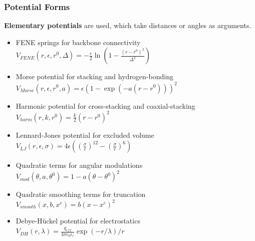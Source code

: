 \documentclass[slidestop,compress,9pt]{beamer}
\begin{document}
\begin{frame}
\frametitle{Potential Forms}
\textbf{Elementary potentials} are used, which take distances or angles as arguments.\\[10pt]
\begin{itemize}
\setlength\itemsep{7pt}
\item FENE springs for backbone connectivity\\
$V_{FENE}(r,\epsilon,r^0,\Delta)=-\frac{\epsilon}{2}\ln\left(1-\frac{(r-r^0)^2}{\Delta^2}\right)$
\item Morse potential for stacking and hydrogen-bonding\\
$V_{Morse}(r,\epsilon,r^0,a)=\epsilon(1-\exp(-a(r-r^0)))^2$
\item Harmonic potential for cross-stacking and coaxial-stacking\\
$V_{harm}(r,k,r^0)=\frac{k}{2}(r-r^0)^2$
\item Lennard-Jones potential for excluded volume\\
$V_{LJ}(r,\epsilon,\sigma)=4\epsilon\left(\left(\frac{\sigma}{r}\right)^{12} - \left(\frac{\sigma}{r}\right)^6\right)$
\item Quadratic terms for angular modulations\\
$V_{mod}(\theta,a,\theta^0)=1-a(\theta-\theta^0)^2$
\item Quadratic smoothing terms for truncation\\
$V_{smooth}(x,b,x^c)=b(x-x^c)^2$
\item Debye-H\"uckel potential for electrostatics\\
$V_{DH}(r, \lambda)=\frac{q_{eff}}{4\pi\epsilon_0\epsilon_r} \exp(-r/\lambda)/r$
\end{itemize}

\end{frame}
\end{document}
